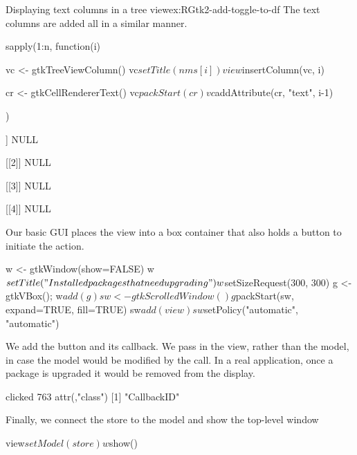 \begin{example}{Displaying text columns in a tree view}{ex:RGtk2-add-toggle-to-df}
The text columns are added all in a similar manner.
\begin{Schunk}
\begin{Sinput}
 sapply(1:n, function(i) {
   vc <- gtkTreeViewColumn()
   vc$setTitle(nms[i])
   view$insertColumn(vc, i)
 
   cr <- gtkCellRendererText()
   vc$packStart(cr)
   vc$addAttribute(cr, "text", i-1)
 })
\end{Sinput}
\begin{Soutput}
[[1]]
NULL

[[2]]
NULL

[[3]]
NULL

[[4]]
NULL
\end{Soutput}
\end{Schunk}

Our basic GUI places the view into a box container that also holds a
button to initiate the action.
\begin{Schunk}
\begin{Sinput}
 w <- gtkWindow(show=FALSE)
 w$setTitle("Installed packages that need upgrading")
 w$setSizeRequest(300, 300)
 g <- gtkVBox(); w$add(g)
 sw <- gtkScrolledWindow()
 g$packStart(sw, expand=TRUE, fill=TRUE)
 sw$add(view)
 sw$setPolicy("automatic", "automatic")
\end{Sinput}
\end{Schunk}

We add the button and its callback. We pass in the view, rather than
the model, in case the model would be modified by the 
call. In a real application, once a package is upgraded it would be
removed from the display.
\begin{Schunk}
\begin{Soutput}
clicked 
    763 
attr(,"class")
[1] "CallbackID"
\end{Soutput}
\end{Schunk}

Finally, we connect the store to the model and show the top-level window
\begin{Schunk}
\begin{Sinput}
 view$setModel(store)
 w$show()
\end{Sinput}
\end{Schunk}
\end{example}
